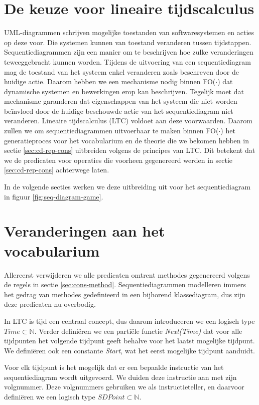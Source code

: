 \section{De keuze voor lineaire tijdscalculus}\label{sec:sd-ltc}
UML-diagrammen schrijven mogelijke toestanden van softwaresystemen en acties op deze voor. Die systemen kunnen van toestand veranderen tussen tijdstappen. Sequentiediagrammen zijn een manier om te beschrijven hoe zulke veranderingen teweeggebracht kunnen worden. Tijdens de uitvoering van een sequentiediagram mag de toestand van het systeem enkel veranderen zoals beschreven door de huidige actie. Daarom hebben we een mechanisme nodig binnen FO($\cdot$) dat dynamische systemen en bewerkingen erop kan beschrijven. Tegelijk moet dat mechanisme garanderen dat eigenschappen van het systeem die niet worden be\"invloed door de huidige beschouwde actie van het sequentiediagram niet veranderen. Lineaire tijdscalculus\cite{BogaertsBart2014Sdsu} (LTC) voldoet aan deze voorwaarden. Daarom zullen we om sequentiediagrammen uitvoerbaar te maken binnen FO($\cdot$) het generatieproces voor het vocabularium en de theorie die we bekomen hebben in sectie \ref{sec:cd-rep-cons} uitbreiden volgens de principes van LTC. Dit betekent dat we de predicaten voor operaties die voorheen gegenereerd werden in sectie \ref{sec:cd-rep-cons} achterwege laten.

In de volgende secties werken we deze uitbreiding uit voor het sequentiediagram in figuur \ref{fig:seq-diagram-game}.

\section{Veranderingen aan het vocabularium}\label{sec:sd-voc}
Allereerst verwijderen we alle predicaten omtrent methodes gegenereerd volgens de regels in sectie \ref{sec:cons-method}. Sequentiediagrammen modelleren immers het gedrag van methodes gedefinieerd in een bijhorend klassediagram, dus zijn deze predicaten nu overbodig.

In LTC is tijd een centraal concept, dus daarom introduceren we een logisch type $Time \subset \mathbb{N}$. Verder defini\"eren we een parti\"ele functie \textit{Next(Time)} dat voor alle tijdpunten het volgende tijdpunt geeft behalve voor het laatst mogelijke tijdpunt. We defini\"eren ook een constante \textit{Start}, wat het eerst mogelijke tijdpunt aanduidt.

Voor elk tijdpunt is het mogelijk dat er een bepaalde instructie van het sequentiediagram wordt uitgevoerd. We duiden deze instructie aan met zijn volgnummer.
Deze volgnummers gebruiken we als instructieteller, en daarvoor defini\"eren we een logisch type $SDPoint \subset \mathbb{N}$.

